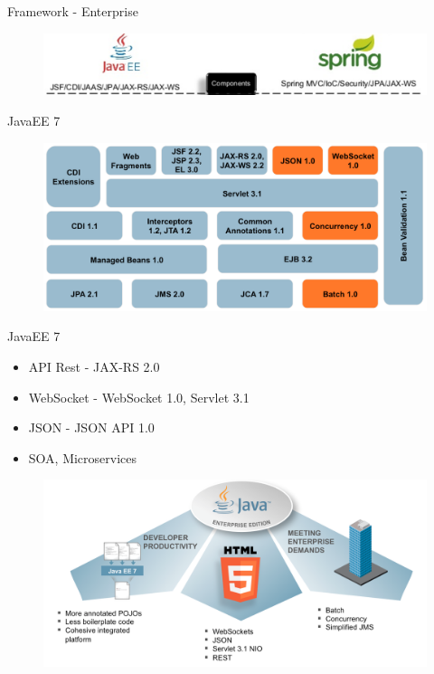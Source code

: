 \documentclass{beamer}
\begin{document}
\begin{frame}{Framework - Enterprise}
	\begin{figure}
		\centering
		\includegraphics[width=\linewidth]{Images/javaeesp}
	\end{figure}
\end{frame}

\begin{frame}{JavaEE 7}
	\begin{figure}
		\centering
		\includegraphics[width=0.9\linewidth]{Images/javaee7-pancake.png}
	\end{figure}	
\end{frame}

\begin{frame}{JavaEE 7}
	\begin{itemize}
		\item API Rest - JAX-RS 2.0
		\item WebSocket - WebSocket 1.0, Servlet 3.1
		\item JSON - JSON API 1.0
		\item SOA, Microservices
	\end{itemize}
	\begin{figure}
		\centering
		\includegraphics[width=0.65\linewidth]{Images/javaee7-theme}
	\end{figure}
\end{frame}
\end{document}

